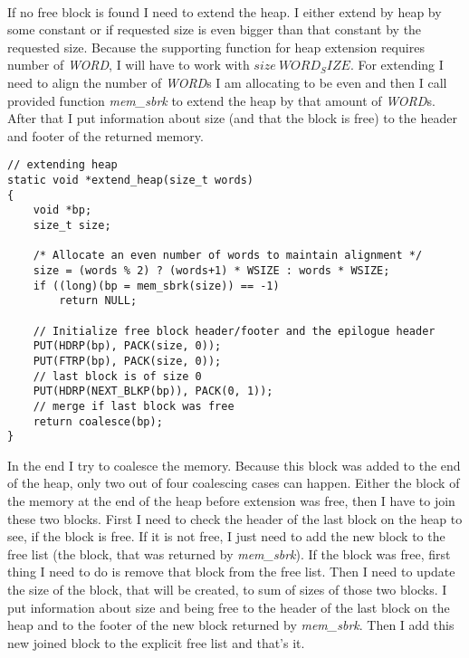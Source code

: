 \documentclass[a4paper]{article}
\begin{document}
\\
If no free block is found I need to extend the heap. I either extend by heap by some constant or
if requested size is even bigger than that constant by the requested size. Because the supporting 
function for heap extension requires number of \textit{WORD}, I will have to work 
with $size \ WORD_SIZE$. 
For extending I need to align the 
number of \textit{WORD}s I am allocating to be even and then I call provided function 
\textit{mem\_sbrk}
to extend the heap by that amount of \textit{WORD}s. After that I put information 
about size (and that the block
is free) to the header and footer of the returned memory.
\begin{lstlisting}[caption= {function for extending heap}]
// extending heap
static void *extend_heap(size_t words)
{
	void *bp;
	size_t size;

	/* Allocate an even number of words to maintain alignment */
	size = (words % 2) ? (words+1) * WSIZE : words * WSIZE;
	if ((long)(bp = mem_sbrk(size)) == -1)
		return NULL;

	// Initialize free block header/footer and the epilogue header
	PUT(HDRP(bp), PACK(size, 0));
	PUT(FTRP(bp), PACK(size, 0));
	// last block is of size 0
	PUT(HDRP(NEXT_BLKP(bp)), PACK(0, 1));
	// merge if last block was free
	return coalesce(bp);
}
\end{lstlisting}

In the end I try to coalesce the memory.
Because this block was added to the end of the heap, only two out of four coalescing cases can happen.
Either the block of the memory at the end of the heap before extension
was free, then I have to join these two blocks. First I need to check the header of the last 
block on the heap to see, if the block is free. If it is not free, I just need to add the  
new block to the free list (the block, that was returned by \textit{mem\_sbrk}).
If the block was free, first thing I need to do is remove that block from the free list.
Then I need to update the size of the block, that will be created, to sum of sizes of those
two blocks. I put information about size and being free to the header of the last block on the heap
and to the footer of the new block returned by \textit{mem\_sbrk}. Then I add this new joined
block to the explicit free list and that's it.
\end{document}
